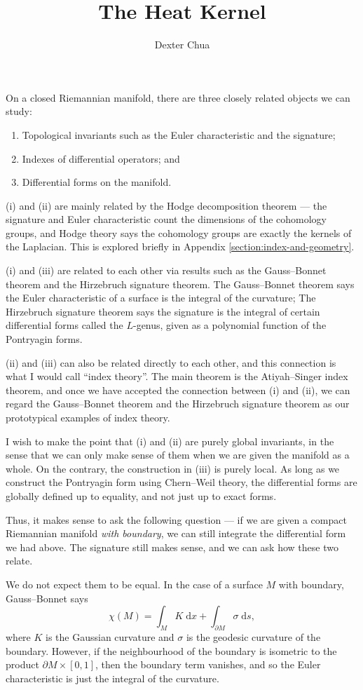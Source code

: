 \documentclass{shortart}
\author{Dexter Chua}
\title{The Heat Kernel}
\theoremstyle{definition}
\renewcommand\d{\mathrm{d}}
\begin{document}
On a closed Riemannian manifold, there are three closely related objects we can study:
\begin{enumerate}
  \item Topological invariants such as the Euler characteristic and the signature;
  \item Indexes of differential operators; and
  \item Differential forms on the manifold.
\end{enumerate}

(i) and (ii) are mainly related by the Hodge decomposition theorem --- the signature and Euler characteristic count the dimensions of the cohomology groups, and Hodge theory says the cohomology groups are exactly the kernels of the Laplacian. This is explored briefly in Appendix \ref{section:index-and-geometry}.

(i) and (iii) are related to each other via results such as the Gauss--Bonnet theorem and the Hirzebruch signature theorem. The Gauss--Bonnet theorem says the Euler characteristic of a surface is the integral of the curvature; The Hirzebruch signature theorem says the signature is the integral of certain differential forms called the $L$-genus, given as a polynomial function of the Pontryagin forms.

(ii) and (iii) can also be related directly to each other, and this connection is what I would call ``index theory''. The main theorem is the Atiyah--Singer index theorem, and once we have accepted the connection between (i) and (ii), we can regard the Gauss--Bonnet theorem and the Hirzebruch signature theorem as our prototypical examples of index theory.

I wish to make the point that (i) and (ii) are purely global invariants, in the sense that we can only make sense of them when we are given the manifold as a whole. On the contrary, the construction in (iii) is purely local. As long as we construct the Pontryagin form using Chern--Weil theory, the differential forms are globally defined up to equality, and not just up to exact forms.

Thus, it makes sense to ask the following question --- if we are given a compact Riemannian manifold \emph{with boundary}, we can still integrate the differential form we had above. The signature still makes sense, and we can ask how these two relate.

We do not expect them to be equal. In the case of a surface $M$ with boundary, Gauss--Bonnet says
\[
  \chi(M) = \int_M K \;\d x + \int_{\partial M} \sigma \;\d s,
\]
where $K$ is the Gaussian curvature and $\sigma$ is the geodesic curvature of the boundary. However, if the neighbourhood of the boundary is isometric to the product $\partial M \times [0, 1]$, then the boundary term vanishes, and so the Euler characteristic is just the integral of the curvature.
\end{document}
